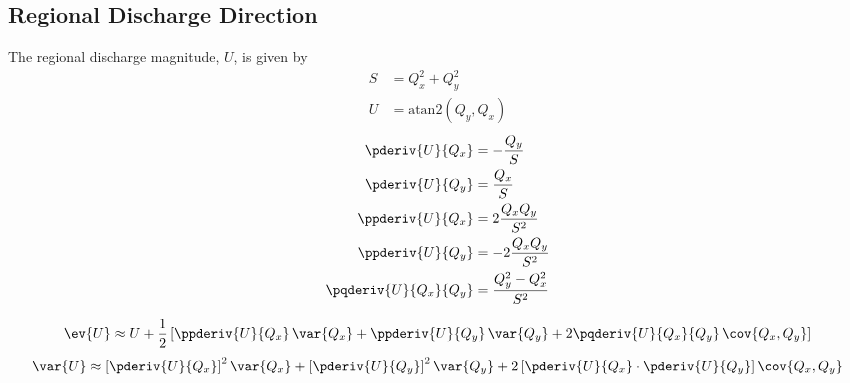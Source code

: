 \subsection{Regional Discharge Direction}
The regional discharge magnitude, $U$, is given by
%
\begin{align}
    S &= Q_x^2 + Q_y^2 \label{2.22}\\
    U &= \text{atan2}\left(Q_y, Q_x\right) \label{2.23}
\end{align}
%
\begin{align}
    \pderiv{U}{Q_x} &= -\frac{Q_y}{S} \label{2.24}\\
    \pderiv{U}{Q_y} &=  \frac{Q_x}{S} \label{2.25}\\
    \ppderiv{U}{Q_x} &=  2 \frac{Q_x Q_y}{S^2} \label{2.26}\\
    \ppderiv{U}{Q_y} &= -2 \frac{Q_x Q_y}{S^2} \label{2.27}\\
    \pqderiv{U}{Q_x}{Q_y} &= \frac{Q_y^2 - Q_x^2}{S^2} \label{2.28}
\end{align}

\begin{equation}\label{2.29}
    \ev{U} \approx U + \frac{1}{2} \left[
        \ppderiv{U}{Q_x} \, \var{Q_x} +
        \ppderiv{U}{Q_y} \, \var{Q_y} +
        2 \pqderiv{U}{Q_x}{Q_y} \, \cov{Q_x,Q_y} \right]
\end{equation}
%
\begin{equation}\label{2.30}
    \var{U} \approx
        \left[ \pderiv{U}{Q_x} \right]^2 \var{Q_x} +
        \left[ \pderiv{U}{Q_y} \right]^2 \var{Q_y} +
        2 \left[ \pderiv{U}{Q_x} \cdot \pderiv{U}{Q_y} \right] \cov{Q_x,Q_y}
\end{equation}



